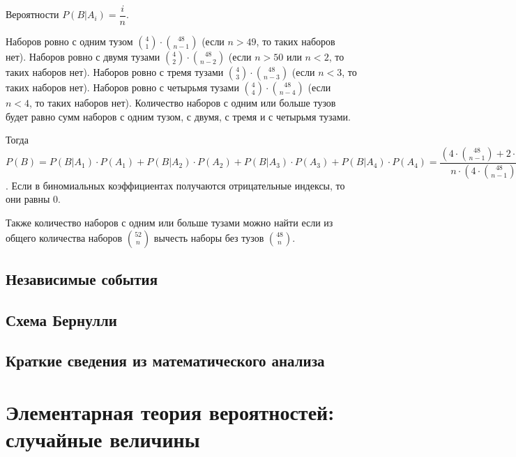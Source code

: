 \documentclass[a4paper,12pt]{article}
\begin{document}
Вероятности \( P(B|A_i) = \dfrac{i}{n} \). 

Наборов ровно с одним тузом \( \binom{4}{1} \cdot \binom{48}{n-1} \) (если \(n>49\), то таких наборов нет). Наборов ровно с двумя тузами \( \binom{4}{2} \cdot \binom{48}{n-2} \) (если \(n>50\) или \(n<2\), то таких наборов нет). Наборов ровно с тремя тузами \( \binom{4}{3} \cdot \binom{48}{n-3} \) (если  \(n<3\), то таких наборов нет). Наборов ровно с четырьмя тузами \( \binom{4}{4} \cdot \binom{48}{n-4} \) (если  \(n<4\), то таких наборов нет). Количество наборов с одним или больше тузов будет равно сумм наборов с одним тузом, с двумя, с тремя и с четырьмя тузами.

Тогда \( P(B) = P(B|A_1) \cdot P(A_1) + P(B|A_2) \cdot P(A_2) + P(B|A_3) \cdot P(A_3) + P(B|A_4) \cdot P(A_4) = \dfrac{ \left( 4 \cdot \binom{48}{n-1} + 2 \cdot 6 \cdot \binom{48}{n-2} + 3 \cdot 4 \cdot \binom{48}{n-3} + 4 \cdot \binom{48}{n-4} \right) }{n \cdot \left( 4 \cdot \binom{48}{n-1} + 6 \cdot \binom{48}{n-2} + 4 \cdot \binom{48}{n-3} + \binom{48}{n-4} \right) } \). Если в биномиальных коэффициентах получаются отрицательные индексы, то они равны 0. 

Также количество наборов с одним или больше тузами можно найти если из общего количества наборов \( \binom{52}{n} \) вычесть наборы без тузов \( \binom{48}{n} \).



\subsection{Независимые события}
\subsection{Схема Бернулли}
\subsection{Краткие сведения из математического анализа}


\section{Элементарная теория вероятностей: случайные величины}
\end{document}
